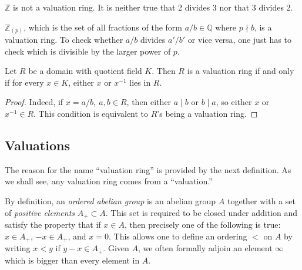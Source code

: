 \begin{example}
$\mathbb{Z}$ is not a valuation ring. It is neither true that  2 divides 3
nor that 3 divides 2.
\end{example}

\begin{example}
$\mathbb{Z}_{(p)}$, which is the set of all fractions of the form $a/b \in
\mathbb{Q}$ where $p \nmid b$, is a valuation ring. To check whether $a/b$
divides $a'/b'$ or vice versa, one  just has to check which is divisible by
the larger power of $p$.
\end{example}

\begin{proposition}
Let $R$ be a domain with quotient field $K$. Then $R$ is a valuation ring if
and only if for every $x \in K$, either $x$ or $x^{-1}$ lies in $R$.
\end{proposition}

\begin{proof} Indeed, if $x=a/b , \ a,b \in R$, then either $a \mid
b$ or $b \mid a$, so either $x$ or $x^{-1} \in R$. This condition is equivalent
to $R$'s being a valuation ring.
\end{proof}


\subsection{Valuations}
The reason for the name ``valuation ring'' is provided by the next definition.
As we shall see, any valuation ring comes from a ``valuation.''

By definition, an \emph{ordered abelian group} is an abelian group $A$
together with a set of \emph{positive elements} $A_+ \subset A$. This set is
required to be closed under addition and satisfy the property that if $x \in
A$, then precisely one of the following is true: $x \in A_+$, $-x \in A_+$,
and $x = 0$. This allows one to define an ordering $<$ on $A$ by writing $x<y$
if $y-x \in A_+$.
Given $A$, we often formally adjoin an element $\infty$ which is bigger than
every element in $A$.



